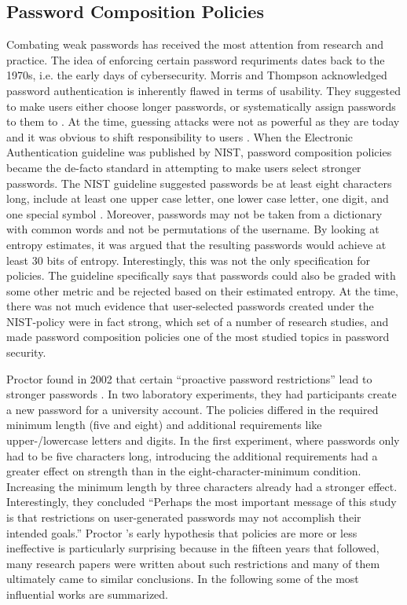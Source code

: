 	\subsection{Password Composition Policies}\label{sec:rw:policies}
	Combating weak passwords has received the most attention from research and practice. The idea of enforcing certain password requriments dates back to the 1970s, i.e. the early days of cybersecurity. Morris and Thompson acknowledged password authentication is inherently flawed in terms of usability. They suggested to make users either choose longer passwords, or systematically assign passwords to them to \cite{Morris1979PasswordSecurity}.
	At the time, guessing attacks were not as powerful as they are today and it was obvious to shift responsibility to users \cite{Feldmeier1990UnixPasswordSecurity}. When the Electronic Authentication guideline was published by \gls{NIST}, password composition policies became the de-facto standard in attempting to make users select stronger passwords. The NIST guideline suggested passwords be at least eight characters long, include at least one upper case letter, one lower case letter, one digit, and one special symbol \cite{Burr2004NISTEntropy}. Moreover, passwords may not be taken from a dictionary with common words and not be permutations of the username. By looking at entropy estimates, it was argued that the resulting passwords would achieve at least 30 bits of entropy. Interestingly, this was not the only specification for policies. The guideline specifically says that passwords could also be graded with some other metric and be rejected based on their estimated entropy. At the time, there was not much evidence that user-selected passwords created under the NIST-policy were in fact strong, which set of a number of research studies, and made password composition policies one of the most studied topics in password security. 

	Proctor \etal found in 2002 that certain ``proactive password restrictions'' lead to stronger passwords \cite{Proctor2002ImprovingAuthenticationProactivePasswordRestrictions}. In two laboratory experiments, they had participants create a new password for a university account. The policies differed in the required minimum length (five and eight) and additional requirements like upper-/lowercase letters and digits. In the first experiment, where passwords only had to be five characters long, introducing the additional requirements had a greater effect on strength than in the eight-character-minimum condition. Increasing the minimum length by three characters already had a stronger effect. Interestingly, they concluded ``Perhaps the most important message of this study is that restrictions on user-generated passwords may not accomplish their intended goals.'' Proctor \etal's early hypothesis that policies are more or less ineffective is particularly surprising because in the fifteen years that followed, many research papers were written about such restrictions and many of them ultimately came to similar conclusions. In the following some of the most influential works are summarized.
	
